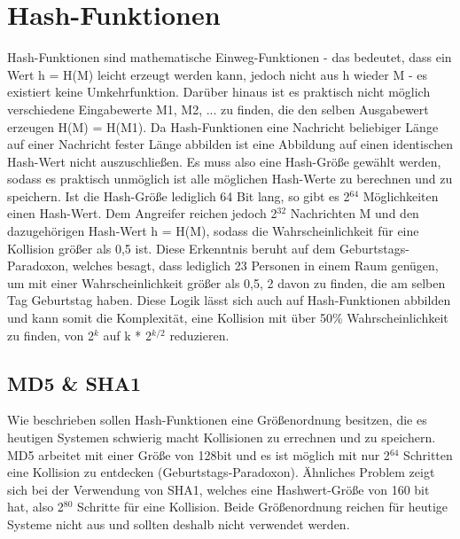 \documentclass[10pt, a4paper]{scrreprt}
\begin{document}
\section{Hash-Funktionen}
Hash-Funktionen sind mathematische Einweg-Funktionen - das bedeutet, dass ein Wert h = H(M) leicht erzeugt werden kann, jedoch nicht aus h wieder M - es existiert keine Umkehrfunktion. Darüber hinaus ist es praktisch nicht möglich verschiedene Eingabewerte M1, M2, ... zu finden, die den selben Ausgabewert erzeugen H(M) = H(M1). Da Hash-Funktionen eine Nachricht beliebiger Länge auf einer Nachricht fester Länge abbilden ist eine Abbildung auf einen identischen Hash-Wert nicht auszuschließen. Es muss also eine Hash-Größe gewählt werden, sodass es praktisch unmöglich ist alle möglichen Hash-Werte zu berechnen und zu speichern. Ist die Hash-Größe lediglich 64 Bit lang, so gibt es 2$^{64}$ Möglichkeiten einen Hash-Wert. Dem Angreifer reichen jedoch 2$^{32}$ Nachrichten M und den dazugehörigen Hash-Wert h = H(M), sodass die Wahrscheinlichkeit für eine Kollision größer als 0,5 ist. Diese Erkenntnis beruht auf dem Geburtstags-Paradoxon, welches besagt, dass lediglich 23 Personen in einem Raum genügen, um mit einer Wahrscheinlichkeit größer als 0,5, 2 davon zu finden, die am selben Tag Geburtstag haben. Diese Logik lässt sich auch auf Hash-Funktionen abbilden und kann somit die Komplexität, eine Kollision mit über 50\% Wahrscheinlichkeit zu finden, von 2$^{k}$ auf k * 2$^{k/2}$ reduzieren.

\subsection{MD5 \& SHA1}
Wie beschrieben sollen Hash-Funktionen eine Größenordnung besitzen, die es heutigen Systemen schwierig macht Kollisionen zu errechnen und zu speichern. MD5 arbeitet mit einer Größe von 128bit und es ist möglich mit nur 2$^{64}$ Schritten eine Kollision zu entdecken (Geburtstags-Paradoxon). Ähnliches Problem zeigt sich bei der Verwendung von SHA1, welches eine Hashwert-Größe von 160 bit hat, also 2$^{80}$ Schritte für eine Kollision. Beide Größenordnung reichen für heutige Systeme nicht aus und sollten deshalb nicht verwendet werden.
\end{document}
